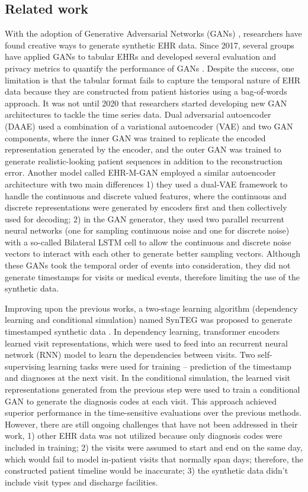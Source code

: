 \begin{multicols}{2}
\section{Related work}
With the adoption of Generative Adversarial Networks (GANs) \cite{Goodfellow2014}, researchers have found creative ways to generate synthetic EHR data. Since 2017, several groups have applied GANs to tabular EHRs and developed several evaluation and privacy metrics to quantify the performance of GANs \cite{Choi2017}. Despite the success, one limitation is that the tabular format fails to capture the temporal nature of EHR data because they are constructed from patient histories using a bag-of-words approach. It was not until 2020 that researchers started developing new GAN architectures to tackle the time series data. Dual adversarial autoencoder (DAAE) \cite{Lee2020} used a combination of a variational autoencoder (VAE) and two GAN components, where the inner GAN was trained to replicate the encoded representation generated by the encoder, and the outer GAN was trained to generate realistic-looking patient sequences in addition to the reconstruction error. Another model called EHR-M-GAN \cite{Li2023} employed a similar autoencoder architecture with two main differences 1) they used a dual-VAE framework to handle the continuous and discrete valued features, where the continuous and discrete representations were generated by encoders first and then collectively used for decoding; 2) in the GAN generator, they used two parallel recurrent neural networks (one for sampling continuous noise and one for discrete noise) with a so-called Bilateral LSTM cell to allow the continuous and discrete noise vectors to interact with each other to generate better sampling vectors. Although these GANs took the temporal order of events into consideration, they did not generate timestamps for visits or medical events, therefore limiting the use of the synthetic data. 

Improving upon the previous works, a two-stage learning algorithm (dependency learning and conditional simulation) named SynTEG was proposed to generate timestamped synthetic data \cite{Zhang2021}. In dependency learning, transformer encoders learned visit representations, which were used to feed into an recurrent neural network (RNN) model to learn the dependencies between visits. Two self-supervising learning tasks were used for training – prediction of the timestamp and diagnoses at the next visit. In the conditional simulation, the learned visit representations generated from the previous step were used to train a conditional GAN to generate the diagnosis codes at each visit. This approach achieved superior performance in the time-sensitive evaluations over the previous methods. However, there are still ongoing challenges that have not been addressed in their work, 1) other EHR data was not utilized because only diagnosis codes were included in training; 2) the visits were assumed to start and end on the same day, which would fail to model in-patient visits that normally span days; therefore, the constructed patient timeline would be inaccurate; 3) the synthetic data didn't include visit types and discharge facilities. 


\end{multicols}
